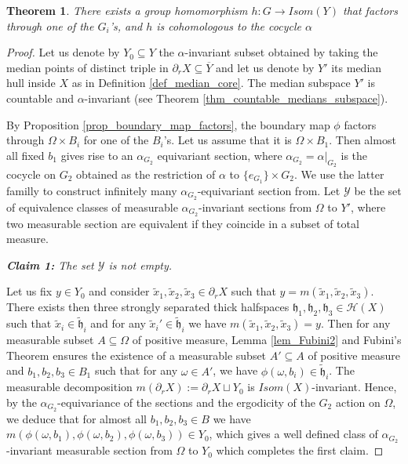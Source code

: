 \documentclass{amsart}
\numberwithin{equation}{section}
\newtheorem{thm}{Theorem}[section]
\newcommand{\HH}{\mathcal{H}}     %
\newcommand{\YY}{\mathcal{Y}}     %
\newcommand{\hh}{\mathfrak{h}}    %
\theoremstyle{definition}
\def\bar{\overline}
\begin{document}
\begin{thm}\label{theoerem_superrigidity_cocycle}
    There exists a group homomorphism $h:G\rightarrow Isom(Y)$ that factors through one of the $G_i$'s, and $h$ is cohomologous to the cocycle $\alpha$
\end{thm}
\begin{proof}
Let us denote by $Y_0\subseteq Y$ the $\alpha$-invariant subset obtained by taking the median points of distinct triple in $\partial_r X\subseteq \bar Y$ and let us denote by $Y'$ its median hull inside $X$ as in Definition \ref{def_median_core}. The median subspace $Y'$ is countable and $\alpha$-invariant (see Theorem \ref{thm_countable_medians_subspace}). \par 
 By Proposition \ref{prop_boundary_map_factors}, the boundary map $\phi$ factors through $\Omega\times B_i$ for one of the $B_i$'s. Let us assume that it is $\Omega\times B_1$. Then almost all fixed $b_1$ gives rise to an $\alpha_{G_2}$ equivariant section, where $\alpha_{G_2} = \alpha|_{G_2}$ is the cocycle on $G_2$ obtained as the restriction of $\alpha$ to $\{e_{G_1}\}\times G_2$. We use the latter familly to construct infinitely many $\alpha_{G_2}$-equivariant section from. Let $\YY$ be the set of equivalence classes of measurable $\alpha_{G_2}$-invariant sections from $\Omega$ to $Y'$, where two measurable section are equivalent if they coincide in a subset of total measure.\par 
 \textit{\textbf{Claim 1:} The set $\YY$ is not empty. }\par 
 Let us fix $y\in Y_0$ and consider $\tilde{x}_1,\tilde{x}_2,\tilde{x}_3\in\partial_r X$ such that $y=m(\tilde{x}_1,\tilde{x}_2,\tilde{x}_3)$. There exists then three strongly separated thick halfspaces $\hh_1,\hh_2,\hh_3\in\HH(X)$ such that $\tilde{x}_i\in\tilde{\hh}_i$ and for any $\tilde{x}_i'\in\tilde{\hh}_i$ we have $m(\tilde{x}_1,\tilde{x}_2,\tilde{x}_3)=y$. Then for any measurable subset $A\subseteq \Omega$ of positive measure, Lemma \ref{lem_Fubini2} and Fubini's Theorem ensures the existence of a measurable subset $A'\subseteq A$ of positive measure  and $b_1,b_2,b_3\in B_1$ such that for any $\omega\in A'$, we have $\phi(\omega,b_i)\in\tilde{\hh}_i$. The measurable decomposition $m(\partial_r X):=\partial_r X\sqcup Y_0$ is $Isom(X)$-invariant. Hence, by the $\alpha_{G_2}$-equivariance of the sections and the ergodicity of the $G_2$ action on $\Omega$, we deduce that for almost all $b_1,b_2,b_3\in B$ we have $m(\phi(\omega,b_1),\phi(\omega,b_2),\phi(\omega,b_3))\in Y_0$, which gives a well defined class of $\alpha_{G_2}$-invariant measurable section from $\Omega$ to $Y_0$ which completes the first claim.  

\end{proof}
\end{document}
